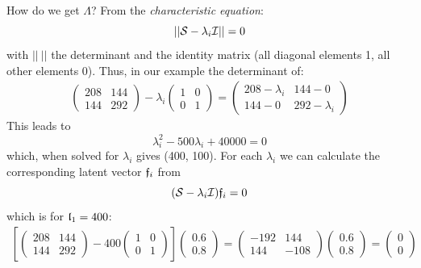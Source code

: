 \begin{refsection}
How do we get \(\Lambda \)? From the \emph{characteristic equation}:
\begin{equation}
  ||\mathcal{S} - \lambda_i \mathcal{I}|| = 0
\end{equation}
with \(||\ || \) the determinant and  the identity matrix (all diagonal elements 1, all other elements 0).
Thus, in our example the determinant of:
\begin{gather}
  \begin{pmatrix} 208 & 144 \\ 144 & 292 \end{pmatrix} -\lambda_i
  \begin{pmatrix} 1 & 0 \\ 0 & 1 \end{pmatrix} =
  \begin{pmatrix} 208-\lambda_i & 144-0 \\ 144-0 & 292-\lambda_i \end{pmatrix}
\end{gather}
This leads to
\begin{equation}
  \lambda_i^2 - 500 \lambda_i + \num{40000} = 0
\end{equation}
which, when solved for \(\lambda_i \) gives (\num{400}, \num{100}). For each \(\lambda_i \) we can calculate the
corresponding latent vector \(\mathfrak{f}_i \) from
\begin{equation}
  (\mathcal{S} - \lambda_i \mathcal{I}) \mathfrak{f}_i = 0
\end{equation}
which is for \(\mathfrak{l}_1 = 400 \):
\begin{gather}
   \left[ \begin{pmatrix} 208 & 144 \\ 144 & 292 \end{pmatrix} - 400
   \begin{pmatrix} 1 & 0 \\ 0 & 1 \end{pmatrix} \right]
   \begin{pmatrix} 0.6 \\ 0.8 \end{pmatrix}  =
   \begin{pmatrix} -192 & 144 \\ 144 & -108 \end{pmatrix}
   \begin{pmatrix} 0.6 \\ 0.8 \end{pmatrix} =
   \begin{pmatrix} 0 \\ 0 \end{pmatrix}
\end{gather}


\end{refsection}
